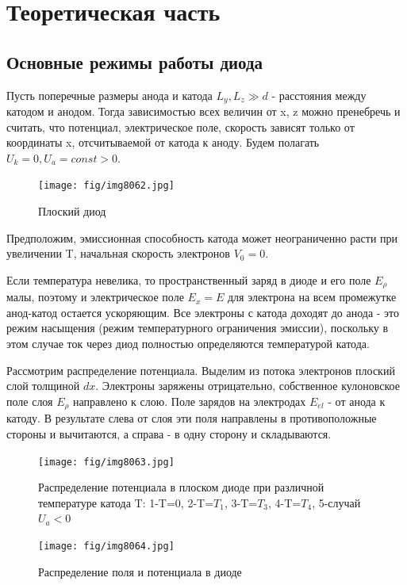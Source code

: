 



\def\labauthors{Войтович Д.А., Понур К.А.}
\def\labgroup{440}
\def\labnumber{1}
\def\labtheme{Исследование влияния пространственного заряда на прохождение тока в диоде}
\def\department{Кафедра общей физики}
\renewcommand{\vec}{\mathbf}
\renewcommand{\phi}{\varphi}
\renewcommand{\hat}{\widehat}



\section{Теоретическая часть}
\subsection{Основные режимы работы диода}
Пусть поперечные размеры анода и катода $L_y,L_z \gg d$ - расстояния между катодом и анодом. Тогда зависимостью всех величин от x, z можно пренебречь и считать, что потенциал, электрическое поле, скорость зависят только от координаты x, отсчитываемой от катода к аноду. Будем полагать $U_k=0, U_a=const > 0$.

\begin{figure}[h!]
    \centering
    \texttt{[image: fig/img8062.jpg]}
    \caption{Плоский диод}
    \label{fig:1}
\end{figure}

Предположим, эмиссионная способность катода может неограниченно расти при увеличении T, начальная скорость электронов $V_0=0$.

Если температура невелика, то пространственный заряд в диоде и его поле $E_{\rho}$ малы, поэтому и электрическое поле $E_x=E$ для электрона на всем промежутке анод-катод остается ускоряющим. Все электроны с катода доходят до анода - это режим насыщения (режим температурного ограничения эмиссии), поскольку в этом случае ток через диод полностью определяются температурой катода.

Рассмотрим распределение потенциала. Выделим из потока электронов плоский слой толщиной $dx$. Электроны заряжены отрицательно, собственное кулоновское поле слоя $E_{\rho}$ направлено к слою. Поле зарядов на электродах $E_{el}$ - от анода к катоду. В результате слева от слоя эти поля направлены в противоположные стороны и вычитаются, а справа - в одну сторону и складываются. 
\begin{figure}[h!]
    \centering
    \texttt{[image: fig/img8063.jpg]}
    \caption{Распределение потенциала в плоском диоде при различной температуре катода T: 1-T=0, 2-T=$T_1$, 3-T=$T_3$, 4-T=$T_4$, 5-случай $U_a<0$}
    \label{fig:2}
\end{figure}
\begin{figure}[h!]
    \centering
    \texttt{[image: fig/img8064.jpg]}
    \caption{Распределение поля и потенциала в диоде}
    \label{fig:3}
\end{figure}

